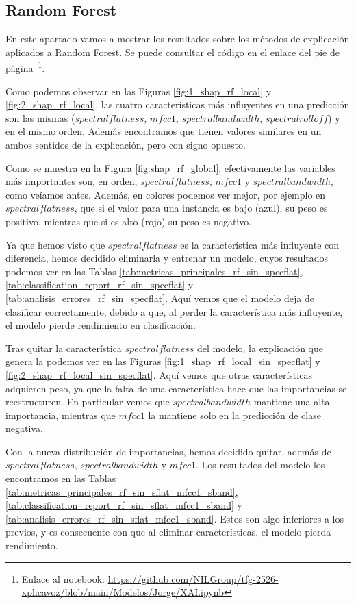 \subsection{Random Forest}
\label{res_xai_rf}

En este apartado vamos a mostrar los resultados sobre los métodos de explicación aplicados a Random Forest. Se puede consultar el código en el enlace del pie de página~\footnote{Enlace al notebook: \url{https://github.com/NILGroup/tfg-2526-xplicavoz/blob/main/Modelos/Jorge/XAI.ipynb}}.

Como podemos observar en las Figuras \ref{fig:1_shap_rf_local} y \ref{fig:2_shap_rf_local}, las cuatro características más influyentes en una predicción son las mismas ($spectral flatness$, $mfcc 1$, $spectral bandwidth$, $spectral rolloff$) y en el mismo orden. Además encontramos que tienen valores similares en un ambos sentidos de la explicación, pero con signo opuesto.

Como se muestra en la Figura \ref{fig:shap_rf_global}, efectivamente las variables más importantes son, en orden, $spectral flatness$, $mfcc 1$ y $spectral bandwidth$, como veíamos antes. Además, en colores podemos ver mejor, por ejemplo en $spectral flatness$, que si el valor para una instancia es bajo (azul), su peso es positivo, mientras que si es alto (rojo) su peso es negativo. 

Ya que hemos visto que $spectral flatness$ es la característica más influyente con diferencia, hemos decidido eliminarla y entrenar un modelo, cuyos resultados podemos ver en las Tablas \ref{tab:metricas_principales_rf_sin_specflat}, \ref{tab:classification_report_rf_sin_specflat} y \ref{tab:analisis_errores_rf_sin_specflat}. Aquí vemos que el modelo deja de clasificar correctamente, debido a que, al perder la característica más influyente, el modelo pierde rendimiento en clasificación.

Tras quitar la característica $spectral flatness$ del modelo, la explicación que genera la podemos ver en las Figuras \ref{fig:1_shap_rf_local_sin_specflat} y \ref{fig:2_shap_rf_local_sin_specflat}. Aquí vemos que otras características adquieren peso, ya que la falta de una característica hace que las importancias se reestructuren. En particular vemos que $spectral bandwidth$ mantiene una alta importancia, mientras que $mfcc 1$ la mantiene solo en la predicción de clase negativa.

Con la nueva distribución de importancias, hemos decidido quitar, además de $spectral flatness$, $spectral bandwidth$ y $mfcc 1$. Los resultados del modelo los encontramos en las Tablas \ref{tab:metricas_principales_rf_sin_sflat_mfcc1_sband}, \ref{tab:classification_report_rf_sin_sflat_mfcc1_sband} y \ref{tab:analisis_errores_rf_sin_sflat_mfcc1_sband}. Estos son algo inferiores a los previos, y es consecuente con que al eliminar características, el modelo pierda rendimiento.

